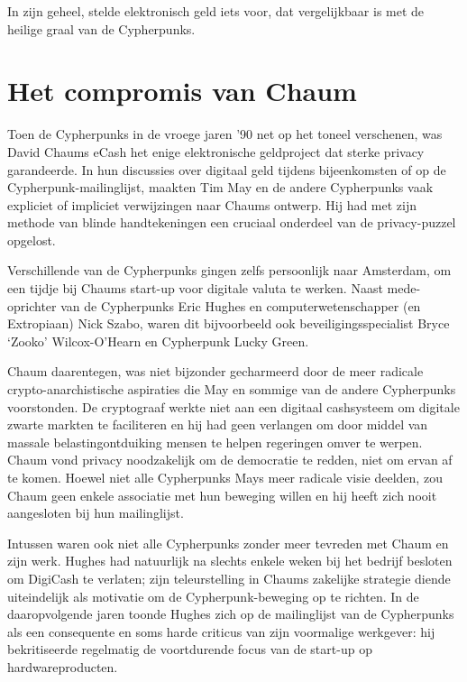 \documentclass[
  a5paper,
  smalldemyvopaper,11pt,twoside,onecolumn,openright,extrafontsizes,
hidelinks]{memoir}
\begin{document}
In zijn geheel, stelde elektronisch geld iets voor, dat vergelijkbaar is
met de heilige graal van de Cypherpunks.

\section{Het compromis van Chaum}\label{het-compromis-van-chaum}

Toen de Cypherpunks in de vroege jaren '90 net op het toneel verschenen,
was David Chaums eCash het enige elektronische geldproject dat sterke
privacy garandeerde. In hun discussies over digitaal geld tijdens
bijeenkomsten of op de Cypherpunk-mailinglijst, maakten Tim May en de
andere Cypherpunks vaak expliciet of impliciet verwijzingen naar Chaums
ontwerp. Hij had met zijn methode van blinde handtekeningen een cruciaal
onderdeel van de privacy-puzzel opgelost.

Verschillende van de Cypherpunks gingen zelfs persoonlijk naar
Amsterdam, om een tijdje bij Chaums start-up voor digitale valuta te
werken. Naast mede-oprichter van de Cypherpunks Eric Hughes en
computerwetenschapper (en Extropiaan) Nick Szabo, waren dit bijvoorbeeld
ook beveiligingsspecialist Bryce `Zooko' Wilcox-O'Hearn en Cypherpunk
Lucky Green.

Chaum daarentegen, was niet bijzonder gecharmeerd door de meer radicale
crypto-anarchistische aspiraties die May en sommige van de andere
Cypherpunks voorstonden. De cryptograaf werkte niet aan een digitaal
cashsysteem om digitale zwarte markten te faciliteren en hij had geen
verlangen om door middel van massale belastingontduiking mensen te
helpen regeringen omver te werpen. Chaum vond privacy noodzakelijk om de
democratie te redden, niet om ervan af te komen. Hoewel niet alle
Cypherpunks Mays meer radicale visie deelden, zou Chaum geen enkele
associatie met hun beweging willen en hij heeft zich nooit aangesloten
bij hun mailinglijst.

Intussen waren ook niet alle Cypherpunks zonder meer tevreden met Chaum
en zijn werk. Hughes had natuurlijk na slechts enkele weken bij het
bedrijf besloten om DigiCash te verlaten; zijn teleurstelling in Chaums
zakelijke strategie diende uiteindelijk als motivatie om de
Cypherpunk-beweging op te richten. In de daaropvolgende jaren toonde
Hughes zich op de mailinglijst van de Cypherpunks als een consequente en
soms harde criticus van zijn voormalige werkgever: hij bekritiseerde
regelmatig de voortdurende focus van de start-up op hardwareproducten.
\end{document}
